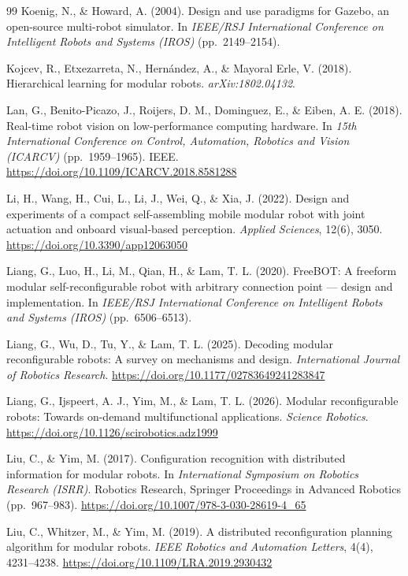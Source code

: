 \documentclass[11pt,a4paper]{article}
\begin{document}
{\begin{thebibliography}{99}
Koenig, N., \& Howard, A. (2004). Design and use paradigms for Gazebo, an
open-source multi-robot simulator. In \textit{IEEE/RSJ International Conference
on Intelligent Robots and Systems (IROS)} (pp.\ 2149--2154).

Kojcev, R., Etxezarreta, N., Hern\'andez, A., \& Mayoral Erle, V. (2018).
Hierarchical learning for modular robots. \textit{arXiv:1802.04132}.

Lan, G., Benito-Picazo, J., Roijers, D. M., Dominguez, E., \& Eiben, A. E.
(2018). Real-time robot vision on low-performance computing hardware. In
\textit{15th International Conference on Control, Automation, Robotics and
Vision (ICARCV)} (pp.\ 1959--1965). IEEE.
\url{https://doi.org/10.1109/ICARCV.2018.8581288}

Li, H., Wang, H., Cui, L., Li, J., Wei, Q., \& Xia, J. (2022). Design and
experiments of a compact self-assembling mobile modular robot with joint
actuation and onboard visual-based perception. \textit{Applied Sciences},
12(6), 3050. \url{https://doi.org/10.3390/app12063050}

Liang, G., Luo, H., Li, M., Qian, H., \& Lam, T. L. (2020). FreeBOT: A freeform
modular self-reconfigurable robot with arbitrary connection point --- design
and implementation. In \textit{IEEE/RSJ International Conference on Intelligent
Robots and Systems (IROS)} (pp.\ 6506--6513).

Liang, G., Wu, D., Tu, Y., \& Lam, T. L. (2025). Decoding modular
reconfigurable robots: A survey on mechanisms and design.
\textit{International Journal of Robotics Research}.
\url{https://doi.org/10.1177/02783649241283847}

Liang, G., Ijspeert, A. J., Yim, M., \& Lam, T. L. (2026). Modular
reconfigurable robots: Towards on-demand multifunctional applications.
\textit{Science Robotics}.
\url{https://doi.org/10.1126/scirobotics.adz1999}

Liu, C., \& Yim, M. (2017). Configuration recognition with distributed
information for modular robots. In \textit{International Symposium on Robotics
Research (ISRR)}. Robotics Research, Springer Proceedings in Advanced Robotics
(pp.\ 967--983). \url{https://doi.org/10.1007/978-3-030-28619-4_65}

Liu, C., Whitzer, M., \& Yim, M. (2019). A distributed reconfiguration planning
algorithm for modular robots. \textit{IEEE Robotics and Automation Letters},
4(4), 4231--4238. \url{https://doi.org/10.1109/LRA.2019.2930432}


\end{thebibliography}}
\end{document}
